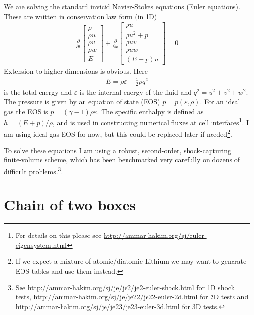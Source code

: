 \documentclass{tufte-handout}
\begin{document}
We are solving the standard invicid Navier-Stokes equations (Euler
equations). These are written in conservation law form (in 1D)
\begin{align}
  \frac{\partial}{\partial{t}}
  \left[
    \begin{matrix}
      \rho \\
      \rho u \\
      \rho v \\
      \rho w \\
      E
    \end{matrix}
  \right]
  +
  \frac{\partial}{\partial{x}}
  \left[
    \begin{matrix}
      \rho u \\
      \rho u^2 + p \\
      \rho uv \\
      \rho uw \\
      (E+p)u
    \end{matrix}
  \right]
  =
  0
\end{align}
Extension to higher dimensions is obvious. Here
\begin{align}
  E = \rho \varepsilon + \frac{1}{2}\rho q^2  
\end{align}
is the total energy and $\varepsilon$ is the internal energy of the
fluid and $q^2=u^2 + v^2 + w^2$. The pressure is given by an equation
of state (EOS) $p=p(\varepsilon, \rho)$. For an ideal gas the EOS is
$p = (\gamma-1)\rho \varepsilon$. The specific enthalpy is defined as
$h = (E+p)/\rho$, and is used in constructing numerical fluxes at cell
interfaces\footnote{For details on this please see
  \url{http://ammar-hakim.org/sj/euler-eigensystem.html}}. I am using
ideal gas EOS for now, but this could be replaced later if
needed\footnote{If we expect a mixture of atomic/diatomic Lithium we
  may want to generate EOS tables and use them instead.}.

To solve these equations I am using a robust, second-order,
shock-capturing finite-volume scheme, which has been benchmarked very
carefully on dozens of difficult problems.\footnote{See
  \url{http://ammar-hakim.org/sj/je/je2/je2-euler-shock.html} for 1D
  shock tests,
  \url{http://ammar-hakim.org/sj/je/je22/je22-euler-2d.html} for 2D
  tests and \url{http://ammar-hakim.org/sj/je/je23/je23-euler-3d.html}
  for 3D tests.}.


\section{Chain of two boxes}
\end{document}

